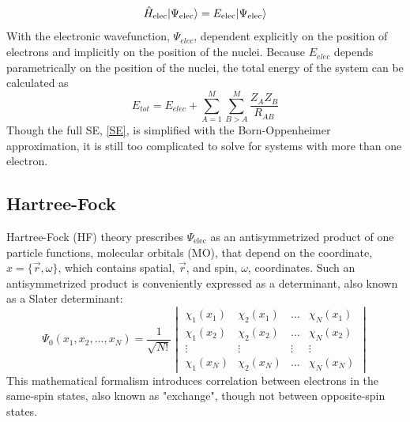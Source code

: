     \begin{equation}
     \hat{H}_{\text{elec}} | \Psi_{\text{elec}} \rangle = E_{\text{elec}}| \Psi_{\text{elec}} \rangle
    \end{equation}
  With the electronic wavefunction, $\Psi_{elec}$, dependent explicitly on the position of electrons and implicitly on the position of the nuclei. Because $E_{elec}$ depends parametrically on the position of the nuclei, the total energy of the system can be calculated as 
    \begin{equation}
      E_{tot} = E_{elec} + \sum_{A=1}^{M} \sum_{B>A}^{M} \frac{Z_A Z_B}{R_{AB}}
    \end{equation}
  Though the full SE, \cref{SE}, is simplified with the Born-Oppenheimer approximation, it is still too complicated to solve for systems with more than one electron.\cite{SzaboAttila1982}
  \subsection{Hartree-Fock}
    Hartree-Fock (HF) theory\cite{Hartree1928b,SzaboAttila1982,Sherrill2000} prescribes $\Psi_{\text{elec}}$ as an antisymmetrized product of one particle functions, molecular orbitals (MO), that depend on the coordinate, $x = \{\vec{r}, \omega\}$, which contains spatial, $\vec{r}$, and spin, $\omega$, coordinates. Such an antisymmetrized product is conveniently expressed as a determinant, also known as a Slater determinant:\cite{Slater1929,Slater1930} 
    \begin{equation}
      \Psi_{0}(x_1, x_2, ..., x_N) = \frac{1}{\sqrt{N!}}
        \begin{vmatrix}
         \chi_1(x_1) &\chi_2(x_1) &\ldots   &\chi_N(x_1)   \\
         \chi_1(x_2) &\chi_2(x_2)  &\ldots & \chi_N(x_2)   \\
         \vdots&\vdots   &\vdots &\vdots   \\
         \chi_1(x_N) &\chi_2(x_N) & \ldots & \chi_N(x_N)
      \end{vmatrix}
    \end{equation}
    This mathematical formalism introduces correlation between electrons in the same-spin states, also known as "exchange", though not between opposite-spin states.
    
